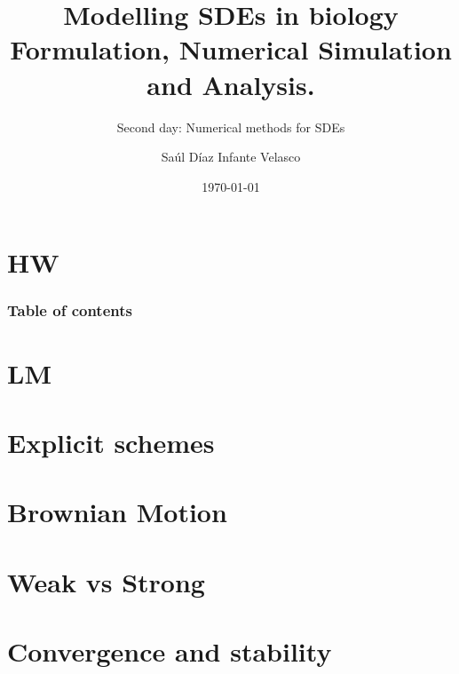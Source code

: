 \documentclass[9pt]{beamer}
\title{Modelling SDEs in biology\\
    Formulation, Numerical Simulation and Analysis.}
\subtitle{Second day: Numerical methods for SDEs}
\author{Saúl Díaz Infante Velasco}
\institute{CONACYT-UNIVERSIDAD de SONORA, Cimat, Guanajuato Gto}
\date{\today}
\begin{document}
    \titlepage
    \section{HW}
        
    \begin{frame}
        \frametitle{Table of contents}
        \tableofcontents
    \end{frame}
    \section{LM}
        
    \section{Explicit schemes}
        
        
    \section{Brownian Motion}
        
    \section{Weak vs Strong}
        
        
        
    \section{Convergence and stability}
        
        
    \appendix
        
\end{document}
